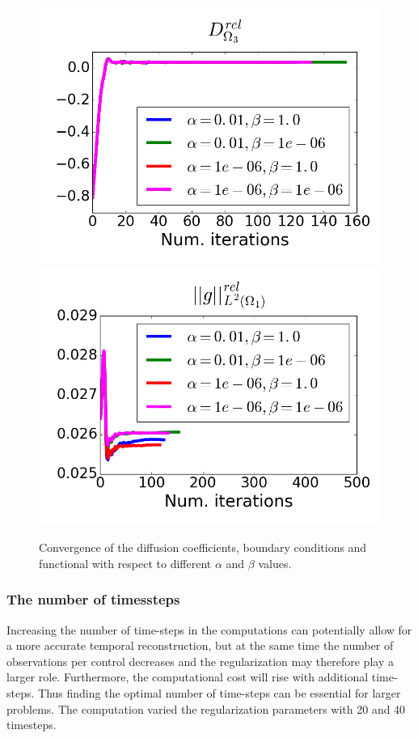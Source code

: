 \documentclass[11pt,a4paper]{article}
\begin{document}
\begin{figure}
\includegraphics[scale=0.2]{Convergence3}  
\includegraphics[scale=0.2]{Convergence4}  
\label{convergence}
\caption{Convergence of the diffusion coefficients, boundary conditions and functional with respect to different $\alpha$ and $\beta$ values. } 
\label{convergence}
\end{figure}

\subsubsection{The number of timessteps}
Increasing the number of time-steps in the computations can potentially allow for a more accurate temporal reconstruction, but at the same time the number of observations per control decreases and the regularization may therefore play a larger role. Furthermore, the computational cost will rise with additional time-steps. Thus finding the optimal number of time-steps can be essential for larger problems. The computation varied the regularization parameters with 20 and 40 timesteps.
\end{document}
